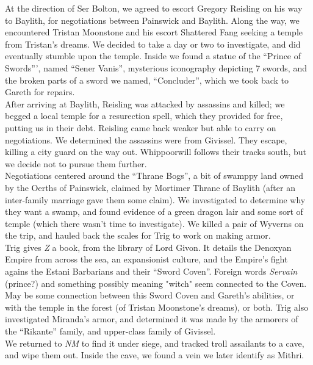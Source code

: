\documentclass[letterpaper]{article}
\begin{document}
\noindent At the direction of Ser Bolton, we agreed to escort Gregory Reisling on his way to Baylith, for negotiations between Painswick and Baylith.  Along the way, we encountered Tristan Moonstone and his escort Shattered Fang seeking a temple from Tristan's dreams. We decided to take a day or two to investigate, and did eventually stumble upon the temple.  Inside we found a statue of the ``Prince of Swords''', named ``Sener Vanis'', mysterious iconography depicting 7 swords, and the broken parts of a sword we named, ``Concluder'', which we took back to Gareth for repairs.\\

\noindent After arriving at Baylith, Reisling was attacked by assassins and killed; we begged a local temple for a resurection spell, which they provided for free, putting us in their debt.  Reisling came back weaker but able to carry on negotiations.  We determined the assassins were from Givissel.  They escape, killing a city guard on the way out.  Whippoorwill follows their tracks south, but we decide not to pursue them further.\\

\noindent Negotiations centered around the ``Thrane Bogs'', a bit of swamppy land owned by the Oerths of Painswick, claimed by Mortimer Thrane of Baylith (after an inter-family marriage gave them some claim).  We investigated to determine why they want a swamp, and found evidence of a green dragon lair and some sort of temple (which there wasn't time to investigate).  We killed a pair of Wyverns on the trip, and hauled back the scales for Trig to work on making armor.\\

\noindent Trig gives \emph{Z} a book, from the library of Lord Givon.  It details the Denoxyan Empire from across the sea, an expansionist culture, and the Empire's fight agains the Estani Barbarians and their ``Sword Coven''. Foreign words \emph{Servain} (prince?) and something possibly meaning "witch" seem connected to the Coven.  May be some connection between this Sword Coven and Gareth's abilities, or with the temple in the forest (of Tristan Moonstone's dreams), or both.  Trig also investigated Miranda's armor, and determined it was made by the armorers of the ``Rikante'' family, and upper-class family of Givissel.\\

\noindent We returned to \emph{NM} to find it under siege, and tracked troll assailants to a cave, and wipe them out. Inside the cave, we found a vein we later identify as Mithri.\\
\end{document}
